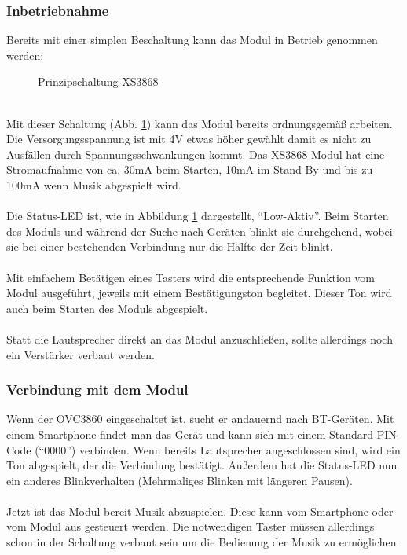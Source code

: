 \subsubsection{Inbetriebnahme}
Bereits mit einer simplen Beschaltung kann das Modul in Betrieb genommen werden:
\begin{figure} [h]
	\centering
	\caption{Prinzipschaltung XS3868}
	\label {fig:abb2.3}
\end{figure} \\
Mit dieser Schaltung (Abb. \ref {fig:abb2.3}) kann das Modul bereits ordnungsgemäß arbeiten.\\
Die Versorgungsspannung ist mit 4V etwas höher gewählt damit es nicht zu Ausfällen durch Spannungsschwankungen kommt. Das XS3868-Modul hat eine Stromaufnahme von ca. 30mA beim Starten, 10mA im Stand-By und bis zu 100mA wenn Musik abgespielt wird.\\ \\
Die Status-LED ist, wie in Abbildung \ref {fig:abb2.3} dargestellt, \enquote{Low-Aktiv}. Beim Starten des Moduls und während der Suche nach Geräten blinkt sie durchgehend, wobei sie bei einer bestehenden Verbindung nur die Hälfte der Zeit blinkt.\\ \\
Mit einfachem Betätigen eines Tasters wird die entsprechende Funktion vom Modul ausgeführt, jeweils mit einem Bestätigungston begleitet. Dieser Ton wird auch beim Starten des Moduls abgespielt.\\ \\
Statt die Lautsprecher direkt an das Modul anzuschließen, sollte allerdings noch ein Verstärker verbaut werden.
\newpage


\subsubsection{Verbindung mit dem Modul}
Wenn der OVC3860 eingeschaltet ist, sucht er andauernd nach BT-Geräten. Mit einem Smartphone findet man das Gerät und kann sich mit einem Standard-PIN-Code (\enquote{0000}) verbinden. Wenn bereits Lautsprecher angeschlossen sind, wird ein Ton abgespielt, der die Verbindung bestätigt. Außerdem hat die Status-LED nun ein anderes Blinkverhalten (Mehrmaliges Blinken mit längeren Pausen).\\ \\
Jetzt ist das Modul bereit Musik abzuspielen. Diese kann vom Smartphone oder vom Modul aus gesteuert werden. Die notwendigen Taster müssen allerdings schon in der Schaltung verbaut sein um die Bedienung der Musik zu ermöglichen.


